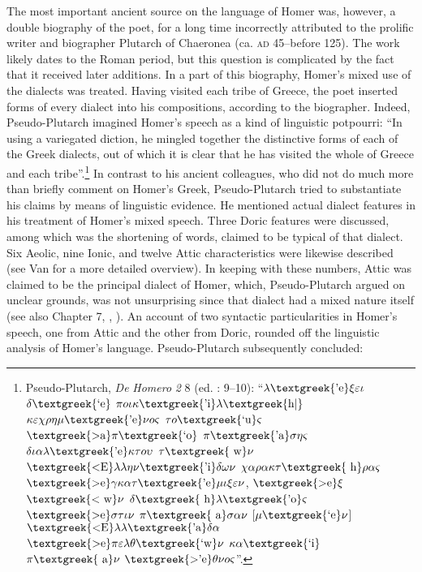 The most important ancient source on the language of Homer was, however, a double biography of the poet, for a long time incorrectly attributed to the prolific writer and biographer Plutarch of Chaeronea (ca. \textsc{ad} 45–before 125). The work likely dates to the Roman period, but this question is complicated by the fact that it received later additions. In a part of this biography, Homer’s mixed use of the dialects was treated. Having visited each tribe of Greece, the poet inserted forms of every dialect into his compositions, according to the biographer. Indeed, Pseudo-Plutarch imagined Homer’s speech as a kind of linguistic potpourri: “In using a variegated diction, he mingled together the distinctive forms of each of the Greek dialects, out of which it is clear that he has visited the whole of Greece and each tribe”.\footnote{Pseudo-Plutarch, \textit{De} \textit{Homero} \textit{2} 8 (ed. \citealt{Kindstrand1990}: 9–10): “$\lambda \text{\textgreek{'e}}\xi \varepsilon \iota $ $\delta \text{\textgreek{`e}}$ $\pi o\iota \kappa \text{\textgreek{'i}}\lambda \text{\textgreek{h|}}$ $\kappa \varepsilon \chi \rho \eta \mu \text{\textgreek{'e}}\nu o\varsigma $ $\tau o\text{\textgreek{`u}}\varsigma $ $\text{\textgreek{>a}}\pi \text{\textgreek{`o}}$ $\pi \text{\textgreek{'a}}\sigma \eta \varsigma $ $\delta \iota \alpha \lambda \text{\textgreek{'e}}\kappa \tau o\upsilon $ $\tau \text{\textgreek{~w}}\nu $ $\text{\textgreek{<E}}\lambda \lambda \eta \nu \text{\textgreek{'i}}\delta \omega \nu $ $\chi \alpha \rho \alpha \kappa \tau \text{\textgreek{~h}}\rho \alpha \varsigma $ $\text{\textgreek{>e}}\gamma \kappa \alpha \tau \text{\textgreek{'e}}\mu \iota \xi \varepsilon \nu $, $\text{\textgreek{>e}}\xi $ $\text{\textgreek{<~w}}\nu $ $\delta \text{\textgreek{~h}}\lambda \text{\textgreek{'o}}\varsigma $ $\text{\textgreek{>e}}\sigma \tau \iota \nu $ $\pi \text{\textgreek{~a}}\sigma \alpha \nu $ [$\mu \text{\textgreek{`e}}\nu $] $\text{\textgreek{<E}}\lambda \lambda \text{\textgreek{'a}}\delta \alpha $ $\text{\textgreek{>e}}\pi \varepsilon \lambda \theta \text{\textgreek{`w}}\nu $ $\kappa \alpha \text{\textgreek{`i}}$ $\pi \text{\textgreek{~a}}\nu $ $\text{\textgreek{>'e}}\theta \nu o\varsigma $”.} In contrast to his ancient colleagues, who did not do much more than briefly comment on Homer’s Greek, Pseudo-Plutarch tried to substantiate his claims by means of linguistic evidence. He mentioned actual dialect features in his treatment of Homer’s mixed speech. Three Doric features were discussed, among which was the shortening of words, claimed to be typical of that dialect. Six Aeolic, nine Ionic, and twelve Attic characteristics were likewise described (see Van \citealt{Rooy2018c} for a more detailed overview). In keeping with these numbers, Attic was claimed to be the principal dialect of Homer, which, Pseudo-Plutarch argued on unclear grounds, was not unsurprising since that dialect had a mixed nature itself (see also Chapter 7, , ). An account of two syntactic particularities in Homer’s speech, one from Attic and the other from Doric, rounded off the linguistic analysis of Homer’s language. Pseudo-Plutarch subsequently concluded:

